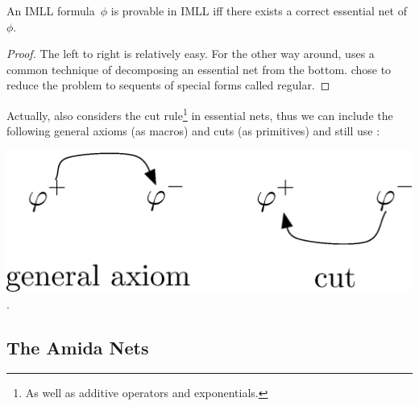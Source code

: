  \begin{theorem}
  \label{essential-ok}
  An IMLL formula~$\phi$ is provable in IMLL iff there exists a correct essential net
  of $\phi$.
 \end{theorem}
 \begin{proof}
  The left to right is relatively easy.  For the other way around,
  \citet{lamarche2008} uses a common technique of decomposing an
  essential net from the bottom.
  \citet{murawski2003} chose to reduce the problem to sequents of special forms
  called regular.
 \end{proof}

 Actually, \citet{lamarche2008} also considers the cut rule\footnote{As well as
 additive operators and exponentials.} in essential nets, thus
 we can include the following general axioms (as macros) and cuts (as
 primitives) and still use :
 \begin{center}
  \includegraphics[scale=0.4]{general-axiom-cut.eps}\enspace.
 \end{center}

\subsection{The Amida Nets}

